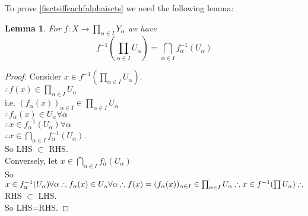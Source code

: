 \documentclass{article}
\newtheorem{slemma}[stheorem]{Lemma}
\theoremstyle{remark}
\theoremstyle{example}
\theoremstyle{examples}
\begin{document}
	To prove \ref{fisctsiffeachfalphaiscts} we need the following lemma:
	\begin{slemma}
		\label{productpreimageisintersection}
		For $f:X \to \prod_{\alpha \in I}Y_\alpha$ we have \[ f^{-1}\left(\prod_{\alpha \in I} U_\alpha\right)=\bigcap_{\alpha \in I} f_\alpha^{-1}\left(U_\alpha\right) \]
	\end{slemma}
	\begin{proof}
		Consider $x \in f^{-1}\left(\prod_{\alpha \in I} U_\alpha\right)$.\\
		$\therefore f(x)\in \prod_{\alpha \in I} U_\alpha$\\
		i.e. $(f_\alpha(x))_{\alpha \in I} \in \prod_{\alpha \in I}U_\alpha$\\
		$\therefore f_\alpha(x) \in U_\alpha \forall \alpha$\\
		$\therefore x \in f_\alpha^{-1}\left(U_\alpha\right) \forall \alpha$\\
		$\therefore x \in \bigcap_{\alpha \in I} f_\alpha^{-1}\left(U_\alpha\right)$.\\
		So LHS $\subset$ RHS.\\
		Conversely, let $x \in \bigcap_{\alpha \in I}f_\alpha^{_1}(U_\alpha)$\\
		So $x \in f_\alpha^{-1}(U_\alpha) \forall \alpha\\
		\therefore f_\alpha(x) \in U_\alpha \forall \alpha\\
		\therefore f(x)=(f_\alpha(x))_{\alpha \in I} \in \prod_{\alpha \in I} U_\alpha\\
		\therefore x \in f^{-1}(\prod U_\alpha)\\
		\therefore$ RHS $\subset$ LHS.\\
		So LHS=RHS.
	\end{proof}
\end{document}
